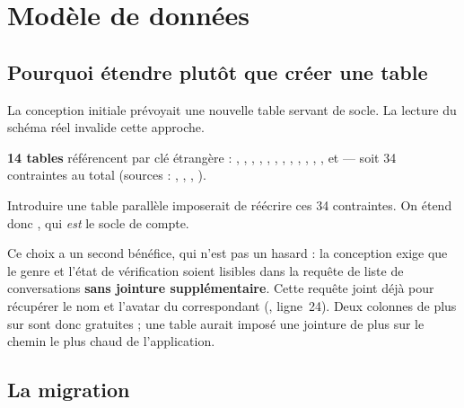 
\chapter{Modèle de données}

\section{Pourquoi étendre  plutôt que créer une table }

La conception initiale prévoyait une nouvelle table  servant de socle. La
lecture du schéma réel invalide cette approche.

\begin{constat}
\textbf{14 tables} référencent  par clé étrangère :
, , , ,
, , , ,
, , , ,
 et  --- soit 34 contraintes au
total (sources : , , ,
).
\end{constat}

Introduire une table parallèle imposerait de réécrire ces 34 contraintes. On étend donc
, qui \emph{est} le socle de compte.

Ce choix a un second bénéfice, qui n'est pas un hasard : la conception exige que le genre
et l'état de vérification soient lisibles dans la requête de liste de conversations
\textbf{sans jointure supplémentaire}. Cette requête joint déjà  pour récupérer
le nom et l'avatar du correspondant
(, ligne~24). Deux colonnes de plus sur
 sont donc gratuites ; une table  aurait imposé une jointure de
plus sur le chemin le plus chaud de l'application.

\section{La migration}

